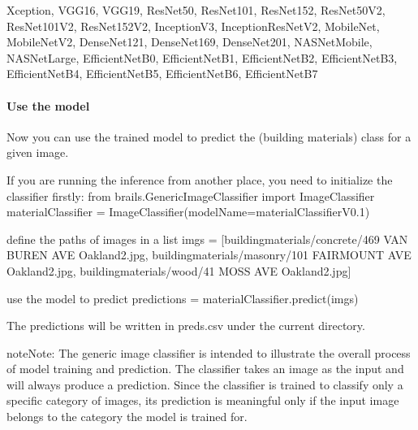 \documentclass[letterpaper,10pt,english]{sphinxmanual}
\begin{document}
\begin{sphinxVerbatim}[commandchars=\\\{\}]
\PYGZsq{}Xception\PYGZsq{},
\PYGZsq{}VGG16\PYGZsq{},
\PYGZsq{}VGG19\PYGZsq{},
\PYGZsq{}ResNet50\PYGZsq{},
\PYGZsq{}ResNet101\PYGZsq{},
\PYGZsq{}ResNet152\PYGZsq{},
\PYGZsq{}ResNet50V2\PYGZsq{},
\PYGZsq{}ResNet101V2\PYGZsq{},
\PYGZsq{}ResNet152V2\PYGZsq{},
\PYGZsq{}InceptionV3\PYGZsq{},
\PYGZsq{}InceptionResNetV2\PYGZsq{},
\PYGZsq{}MobileNet\PYGZsq{},
\PYGZsq{}MobileNetV2\PYGZsq{},
\PYGZsq{}DenseNet121\PYGZsq{},
\PYGZsq{}DenseNet169\PYGZsq{},
\PYGZsq{}DenseNet201\PYGZsq{},
\PYGZsq{}NASNetMobile\PYGZsq{},
\PYGZsq{}NASNetLarge\PYGZsq{},
\PYGZsq{}EfficientNetB0\PYGZsq{},
\PYGZsq{}EfficientNetB1\PYGZsq{},
\PYGZsq{}EfficientNetB2\PYGZsq{},
\PYGZsq{}EfficientNetB3\PYGZsq{},
\PYGZsq{}EfficientNetB4\PYGZsq{},
\PYGZsq{}EfficientNetB5\PYGZsq{},
\PYGZsq{}EfficientNetB6\PYGZsq{},
\PYGZsq{}EfficientNetB7\PYGZsq{}
\end{sphinxVerbatim}


\paragraph{Use the model}
\label{\detokenize{common/user_manual/modules/genericImageClassifier:use-the-model}}
\sphinxAtStartPar
Now you can use the trained model to predict the (building materials) class for a given image.

\begin{sphinxVerbatim}[commandchars=\\\{\}]
\PYGZsh{} If you are running the inference from another place, you need to initialize the classifier firstly:
from brails.GenericImageClassifier import ImageClassifier
materialClassifier = ImageClassifier(modelName=\PYGZsq{}materialClassifierV0.1\PYGZsq{})

\PYGZsh{} define the paths of images in a list
imgs = [\PYGZsq{}building\PYGZus{}materials/concrete/469 VAN BUREN AVE Oakland2.jpg\PYGZsq{},
        \PYGZsq{}building\PYGZus{}materials/masonry/101 FAIRMOUNT AVE Oakland2.jpg\PYGZsq{},
        \PYGZsq{}building\PYGZus{}materials/wood/41 MOSS AVE Oakland2.jpg\PYGZsq{}]

\PYGZsh{} use the model to predict
predictions = materialClassifier.predict(imgs)
\end{sphinxVerbatim}

\sphinxAtStartPar
The predictions will be written in preds.csv under the current directory.

\begin{sphinxadmonition}{note}{Note:}
\sphinxAtStartPar
The generic image classifier is intended to illustrate the overall process of model training and prediction.
The classifier takes an image as the input and will always produce a prediction.
Since the classifier is trained to classify only a specific category of images, its prediction is meaningful only if
the input image belongs to the category the model is trained for.
\end{sphinxadmonition}
\end{document}
